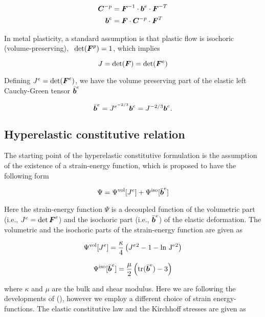 \begin{align}\label{eq:pullpush}
  {\boldsymbol{C}}^{-p} &={\boldsymbol{F}}^{-1} \cdot {\boldsymbol{b}}^e \cdot {\boldsymbol{F}}^{-T}\\ {\boldsymbol{b}}^e &= {\boldsymbol{F}} \cdot
  {\boldsymbol{C}}^{-p} \cdot {\boldsymbol{F}}^T
\end{align}

In metal plasticity, a standard assumption is that plastic flow is
isochoric (volume-preserving), \ie\ $\det({\boldsymbol{F}}^p)=1$, which implies

\begin{equation}
  J = \det ({\boldsymbol{F}}) = \det ({\boldsymbol{F}}^e)
\end{equation}

Defining $J^e=\det({\boldsymbol{F}}^e)$, we have the volume preserving part of the
elastic left Cauchy-Green tensor $\bar{{\boldsymbol{b}}}^e$

\begin{equation}
  \bar{{\boldsymbol{b}}}^e = J^{e^{-2/3}}{\boldsymbol{b}}^e = J^{-2/3}{\boldsymbol{b}}^e.
\end{equation}

\subsection{Hyperelastic constitutive relation}
The starting point of the hyperelastic constitutive formulation is 
the assumption of the existence of a strain-energy function, which is
proposed to have the following form

\begin{equation}
\Psi=\Psi^{\rm vol}[J^e] + \Psi^{\rm iso}[\bar{{\boldsymbol{b}}}^e]
\end{equation}

Here the strain-energy function $\Psi$ is a decoupled function of the
volumetric part (i.e., $J^e=\det{\boldsymbol{F}}^e$) and the isochoric part (i.e.,
$\bar{{\boldsymbol{b}}}^e$) of the elastic deformation. The volumetric and the
isochoric parts of the strain-energy function are given as

\begin{equation}
  \Psi^{\rm vol}[J^e] =\frac{\kappa}{4}\left(J^e{^2} - 1 - \rm ln~J^e{^2}\right)
\end{equation}

\begin{equation}
  \Psi^{\rm iso}[\bar{{\boldsymbol{b}}}^e] =
  \frac{\mu}{2}\left(\rm tr(\bar{{\boldsymbol{b}}}^e)-3\right)
\end{equation}

where $\kappa$ and $\mu$ are the bulk and shear modulus. Here we are
following the developments of (\cite{Steinmann1994}), however we
employ a different choice of strain energy-functions. The elastic
constitutive law and the Kirchhoff stresses are given as

